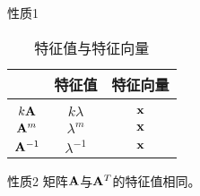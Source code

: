 \begin{frame}
  \begin{footnotesize}
    \begin{block}{性质1}
      \begin{table}
        \caption{特征值与特征向量}
        
        \begin{tabular}{|c|c|c|}\hline
          &特征值&特征向量\\\hline
          \red{$\A$}&\red{$\lambda$}&\red{$\xx$}\\ \hline 
          \hline 
          $k\mathbf{A}$&$k\lambda$&$\xx$\\\hline
          $\mathbf{A}^m$&$\lambda^m$&$\xx$\\\hline
          $\mathbf{A}^{-1}$&$\lambda^{-1}$&$\xx$\\\hline
        \end{tabular}
      \end{table}
    \end{block}
%
    \begin{block}{性质2}
      矩阵$\A$与$\mathbf{A}^T$的特征值相同。
    \end{block}
     
  \end{footnotesize}
\end{frame}

 

